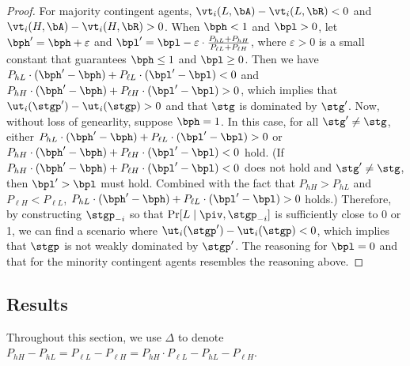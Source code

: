 \begin{proof}
For majority contingent agents, $\vt_i(L, \bA) - \vt_i(L, \bR) < 0$ and $\vt_i(H, \bA) - \vt_i(H, \bR) > 0$. When $\bph < 1$ and $\bpl > 0$, let $\bph' = \bph + \varepsilon$ and $\bpl' = \bpl - \varepsilon\cdot \frac{P_{hL} + P_{hH}}{P_{\ell L} + P_{\ell H}}$, where $\varepsilon > 0$ is a small constant that guarantees $\bph \le 1$ and $\bpl \ge 0$. Then we have $P_{hL} \cdot (\bph' - \bph) + P_{\ell L} \cdot (\bpl' - \bpl) < 0$ and $P_{hH} \cdot (\bph' - \bph) + P_{\ell H} \cdot (\bpl' - \bpl) > 0$, which implies that $\ut_i(\stgp') - \ut_i(\stgp) > 0$ and that $\stg$ is dominated by $\stg'$. Now, without loss of genearlity, suppose $\bph = 1$. In this case, for all $\stg' \neq \stg$, either $P_{hL} \cdot (\bph' - \bph) + P_{\ell L} \cdot (\bpl' - \bpl) > 0$ or $P_{hH} \cdot (\bph' - \bph) + P_{\ell H} \cdot (\bpl' - \bpl) < 0$ hold. (If $P_{hH} \cdot (\bph' - \bph) + P_{\ell H} \cdot (\bpl' - \bpl) < 0$ does not hold and $\stg' \neq \stg$, then $\bpl' > \bpl$ must hold. Combined with the fact that $P_{hH} > P_{hL}$ and $P_{\ell H} < P_{\ell L}$, $P_{hL} \cdot (\bph' - \bph) + P_{\ell L} \cdot (\bpl' - \bpl) > 0$ holds.) Therefore, by constructing $\stgp_{-i}$ so that $\Pr[L \mid \piv, \stgp_{-i}]$ is sufficiently close to 0 or 1, we can find a scenario where $\ut_i(\stgp') - \ut_i(\stgp) < 0$, which implies that $\stgp$ is not weakly dominated by $\stgp'$. 
The reasoning for $\bpl = 0$ and that for the minority contingent agents resembles the reasoning above. 
\end{proof}

\subsection{Results}
Throughout this section, we use $\Delta$ to denote $P_{hH} - P_{hL} = P_{\ell L} - P_{\ell H} = P_{hH}\cdot P_{\ell L} - P_{hL} - P_{\ell H}$. 

